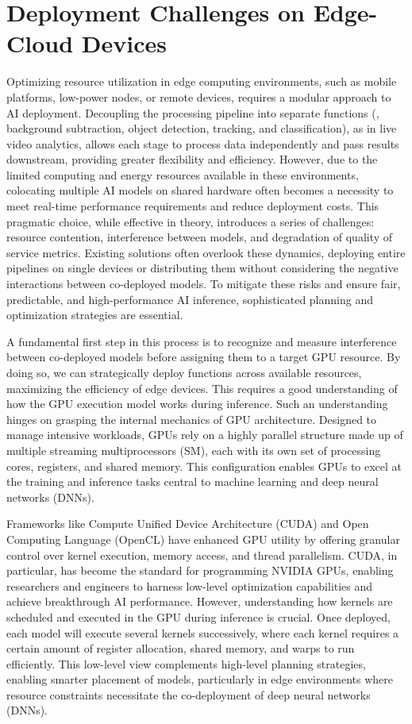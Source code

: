 \section{Deployment Challenges on Edge-Cloud Devices}

Optimizing resource utilization in edge computing environments, such as mobile platforms, low-power nodes, or remote devices, requires a modular approach to AI deployment. Decoupling the processing pipeline into separate functions (\eg, background subtraction, object detection, tracking, and classification), as in live video analytics, allows each stage to process data independently and pass results downstream, providing greater flexibility and efficiency. However, due to the limited computing and energy resources available in these environments, colocating multiple AI models on shared hardware often becomes a necessity to meet real-time performance requirements and reduce deployment costs. This pragmatic choice, while effective in theory, introduces a series of challenges: resource contention, interference between models, and degradation of quality of service metrics. Existing solutions often overlook these dynamics, deploying entire pipelines on single devices or distributing them without considering the negative interactions between co-deployed models. To mitigate these risks and ensure fair, predictable, and high-performance AI inference, sophisticated planning and optimization strategies are essential.

A fundamental first step in this process is to recognize and measure interference between co-deployed models before assigning them to a target GPU resource. By doing so, we can strategically deploy functions across available resources, maximizing the efficiency of edge devices. This requires a good understanding of how the GPU execution model works during inference. Such an understanding hinges on grasping the internal mechanics of GPU architecture. Designed to manage intensive workloads, GPUs rely on a highly parallel structure made up of multiple streaming multiprocessors (SM), each with its own set of processing cores, registers, and shared memory. This configuration enables GPUs to excel at the training and inference tasks central to machine learning and deep neural networks (DNNs).

Frameworks like Compute Unified Device Architecture (CUDA) and Open Computing Language (OpenCL) have enhanced GPU utility by offering granular control over kernel execution, memory access, and thread parallelism. CUDA, in particular, has become the standard for programming NVIDIA GPUs, enabling researchers and engineers to harness low-level optimization capabilities and achieve breakthrough AI performance. However, understanding how kernels are scheduled and executed in the GPU during inference is crucial. Once deployed, each model will execute several kernels successively, where each kernel requires a certain amount of register allocation, shared memory, and warps to run efficiently. This low-level view complements high-level planning strategies, enabling smarter placement of models, particularly in edge environments where resource constraints necessitate the co-deployment of deep neural networks (DNNs).



